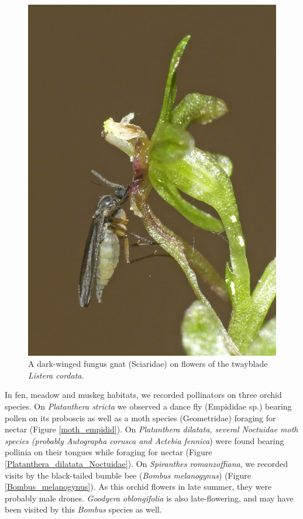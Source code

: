 \begin{multicols}{2}
\begin{figure}[H]
\begin{center}
\vspace{2mm}
\includegraphics[width=\textwidth]{img/Sciaridae.jpg}
\caption{A dark-winged fungus gnat (Sciaridae) on flowers of the twayblade \emph{Listera cordata}.}
\label{Sciaridae}
\end{center}
\end{figure}


In fen, meadow and muskeg habitats, we recorded pollinators on
three orchid species. On \emph{Platanthera stricta} we observed a
dance fly (Empididae sp.) bearing pollen on its proboscis as well
as a moth species (Geometridae) foraging for nectar (Figure \ref{moth_empidid}). On
\emph{Platanthera dilatata, several Noctuidae moth species
(probably \emph{Autographa corusca} and \emph{Actebia fennica}}) were
found bearing pollinia on their tongues while foraging for nectar
(Figure \ref{Platanthera_dilatata_Noctuidae}). On \emph{Spiranthes romanzoffiana}, we recorded visits by
the black-tailed bumble bee (\emph{Bombus melanogynus}) (Figure \ref{Bombus_melanogynus}). As
this orchid flowers in late summer, they were probably male drones.
\emph{Goodyera oblongifolia} is also late-flowering, and may have been
visited by this \emph{Bombus} species as well.


\end{multicols}
